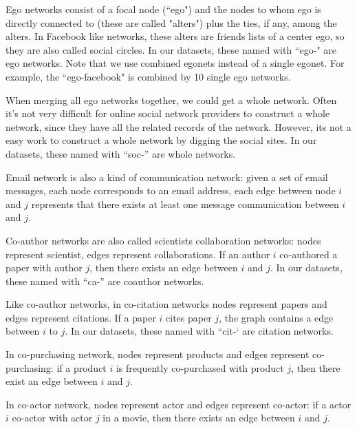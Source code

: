 \documentclass[symmetry,article,submit,moreauthors,pdftex,10pt,a4paper]{Definitions/mdpi}
\begin{document}
\begin{description}[leftmargin=0cm]
\item [ego network] Ego networks consist of a focal node (``ego") and the nodes to whom ego is directly connected to (these are called "alters") plus the ties, if any, among the alters. In Facebook like  networks, these alters are friends lists of a center ego, so they are also called social circles. In our datasets, these named with ``ego-" are ego networks. Note that we use combined egonets instead of a single egonet. For example, the ``ego-facebook" is combined by 10 single ego networks.
\item [whole network] When merging all ego networks together, we could get a whole network. Often it's not very difficult for online social network providers to construct a whole network, since they have all the related records of the network. However, its not a easy work to construct a whole network by digging the social sites. In our datasets, these named with ``soc-'' are whole networks.
\item [email network] Email network is also a kind of communication network: given a set of email messages, each node corresponds to an email address, each edge between node $i$ and $j$ represents that there exists at least one message communication between $i$ and $j$.
\item [co-author network] Co-author networks are also called scientists collaboration networks: nodes represent scientist, edges represent collaborations. If an author $i$ co-authored a paper with author $j$, then there exists an edge between $i$ and $j$. In our datasets, these named with ``ca-'' are coauthor networks.
\item [co-citation network] Like co-author networks, in co-citation networks nodes represent papers and edges represent citations.  If a paper $i$ cites paper $j$, the graph contains a edge between $i$ to $j$. In our datasets, these named with ``cit-` are citation networks.
\item [co-purchasing network] In co-purchasing network, nodes represent products and edges represent co-purchasing: if a product $i$ is frequently co-purchased with product $j$, then there exist an edge between $i$ and $j$.
\item [co-actor network] In co-actor network, nodes represent actor and edges represent co-actor: if a actor $i$ co-actor with actor $j$ in a movie, then there exists an edge between $i$ and $j$.
\end{description}
\end{document}
